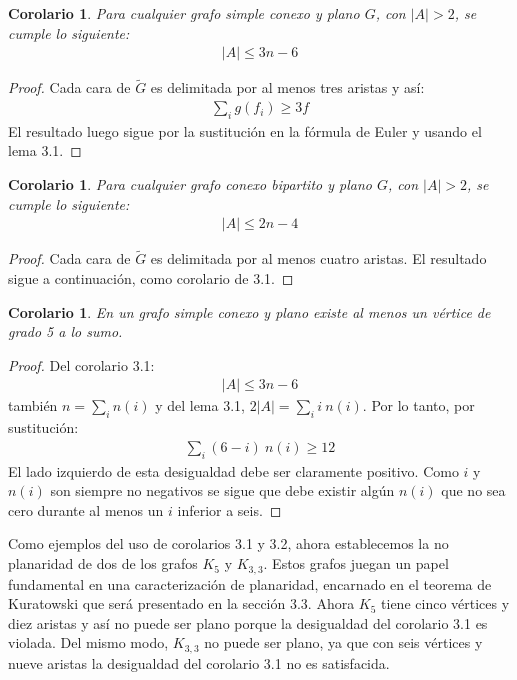 \documentclass[10pt,a5paper]{book}
\newtheorem{cor}[]{Corolario}[chapter]
\begin{document}
\begin{cor}
Para cualquier grafo simple conexo y plano $G$, con $|A| > 2$, se cumple lo siguiente:
\begin{align}
|A| \le 3n - 6\nonumber
\end{align}
\end{cor}

\begin{proof}
Cada cara de $\widetilde{G}$ es delimitada por al menos tres aristas y así:
\begin{align}
\sum_i g(f_i) \ge 3f\nonumber
\end{align}
El resultado luego sigue por la sustitución en la fórmula de Euler y usando el lema 3.1.
\end{proof}

\begin{cor}
Para cualquier grafo conexo \emph{bipartito} y plano $G$, con $|A| > 2$, se cumple lo siguiente:
\begin{align}
|A| \le 2n - 4\nonumber
\end{align}
\end{cor}

\begin{proof}
Cada cara de $\widetilde{G}$ es delimitada por al menos cuatro aristas. El resultado sigue a continuación, como corolario de 3.1.
\end{proof}

\begin{cor}
En un grafo simple conexo y plano existe al menos un vértice de grado 5 a lo sumo.
\end{cor}

\begin{proof}
Del corolario 3.1:
\begin{align}
|A| \le 3n - 6\nonumber
\end{align}
también $n = \sum_i n(i)$ y del lema 3.1, $2|A| = \sum_i i\ n(i)$. Por lo tanto, por sustitución:
\begin{align}
\sum_i (6-i)\ n(i) \ge 12\nonumber
\end{align}
El lado izquierdo de esta desigualdad debe ser claramente positivo. Como $i$ y $n(i)$ son siempre no negativos se sigue que debe existir algún $n(i)$ que no sea cero durante al menos un $i$ inferior a seis.
\end{proof}

Como ejemplos del uso de corolarios 3.1 y 3.2, ahora establecemos la no planaridad de dos de los grafos $K_5$ y $K_{3,3}$. Estos grafos juegan un papel fundamental en una caracterización de planaridad, encarnado en el teorema de Kuratowski que será presentado en la sección 3.3. Ahora $K_5$ tiene cinco vértices y diez aristas y así no puede ser plano porque la desigualdad del corolario 3.1 es violada. Del mismo modo, $K_{3,3}$ no puede ser plano, ya que con seis vértices y nueve aristas la desigualdad del corolario 3.1 no es satisfacida.
\end{document}
